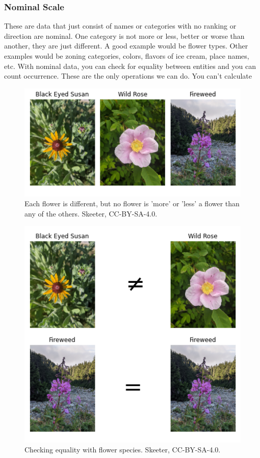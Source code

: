 \documentclass[
]{book}
\begin{document}
\hypertarget{nominal-scale}{%
\subsubsection{Nominal Scale}\label{nominal-scale}}

These are data that just consist of names or categories with no ranking or direction are nominal. One category is not more or less, better or worse than another, they are just different. A good example would be flower types. Other examples would be zoning categories, colors, flavors of ice cream, place names, etc. With nominal data, you can check for equality between entities and you can count occurrence. These are the only operations we can do. You can't calculate

\begin{figure}
\includegraphics[width=0.75\linewidth]{images/03-flowers-nominal} \caption{Each flower is different, but no flower is 'more' or 'less' a flower than any of the others. Skeeter, CC-BY-SA-4.0.}\label{fig:3-flowers-nominal}
\end{figure}
\begin{figure}
\includegraphics[width=0.75\linewidth]{images/03-nominal-opperations} \caption{Checking equality with flower species. Skeeter, CC-BY-SA-4.0.}\label{fig:3-nominal-operations}
\end{figure}
\end{document}
